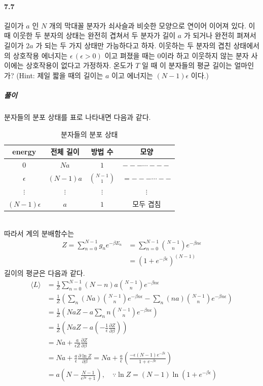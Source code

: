 \documentclass[a4paper,12pt]{report}
\begin{document}
	\paragraph{7.7 } 길이가 $a$ 인 $N$ 개의 막대꼴 분자가 쇠사슬과 비슷한 모양으로 연이어 이어져 있다. 이때 이웃한 두 분자의 상태는 완전히 겹쳐서 두 분자가 길이 $a$ 가 되거나 완전히 펴져서 길이가 $2a$ 가 되는 두 가지 상태만 가능하다고 하자. 이웃하는 두 분자의 겹친 상태에서의 상호작용 에너지는 $\epsilon\, (\epsilon>0)$ 이고 펴졌을 때는 0이라 하고 이웃하지 않는 분자 사이에는 상호작용이 없다고 가정하자. 온도가 $T$ 일 때 이 분자들의 평균 길이는 얼마인가? (Hint: 제일 짧을 때의 길이는 $a$ 이고 에너지는 $(N-1)\epsilon$ 이다.)
	\subparagraph{풀이}분자들의 분포 상태를 표로 나타내면 다음과 같다. 
	\begin{table}[h]
		\caption{분자들의 분포 상태}
		\begin{center}
			\begin{tabular}{|cccc|}\hline
				energy&전체 길이& 방법 수& 모양\\ \hline
				$0$&$Na$&$1$&$---\cdots---$\\ \hline
				$\epsilon$&$(N-1)a$&${N-1\choose1}$&$=---\cdots--$ \\ \hline
				$\vdots$&$\vdots$&$\vdots$&$\vdots$ \\ \hline
				$(N-1)\epsilon$&$a$&$1$& 모두 겹침 \\ \hline
			\end{tabular}
		\end{center}
	\end{table}\\
	따라서 계의 분배함수는
	\begin{equation*}
		\begin{split}
		Z=\sum_{n=0}^{N-1}g_ne^{-\beta E_n}&=\sum_{n=0}^{N-1}{N-1\choose n}e^{-\beta n\epsilon}\\
		&=\left(1+e^{-\beta\epsilon} \right)^{(N-1)} 
		\end{split}
	\end{equation*}
	길이의 평균은 다음과 같다.
	\begin{equation*}
		\begin{split}
		\langle L\rangle&=\frac{1}{Z}\sum_{n=0}^{N-1}(N-n)a{N-1\choose n}e^{-\beta n \epsilon}\\
		&=\frac{1}{Z}\left(\sum_{n}(Na){N-1\choose n}e^{-\beta n\epsilon}-\sum_{n}(na){N-1\choose n}e^{-\beta n \epsilon} \right) \\
		&=\frac{1}{Z}\left(NaZ-a\sum_{n}n{N-1\choose n}e^{-\beta n \epsilon} \right) \\
		&=\frac{1}{Z}\left(NaZ-a\left(-\frac{1}{\epsilon}\frac{\partial Z}{\partial \beta} \right)  \right) \\
		&=Na+\frac{a}{\epsilon Z}\frac{\partial Z}{\partial \beta}\\
		&=Na+\frac{a}{\epsilon}\frac{\partial \ln Z}{\partial \beta}=Na+\frac{a}{\epsilon}\left(\frac{-\epsilon(N-1)e^{-\beta\epsilon}}{1+e^{-\beta\epsilon}} \right) \\
		&=a\left(N-\frac{N-1}{e^{\beta \epsilon}+1} \right) ,\quad \because\ln Z=(N-1)\ln(1+e^{-\beta\epsilon})
		\end{split}
	\end{equation*}
\end{document}
